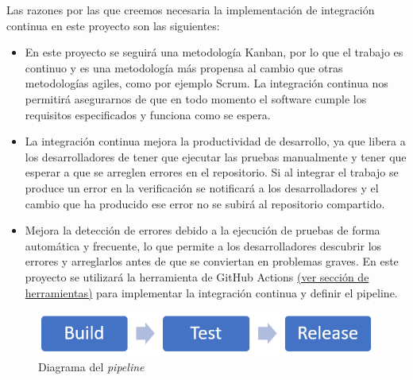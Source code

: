 Las razones por las que creemos necesaria la implementación de integración continua en este proyecto son las siguientes:
\begin{itemize}
    \item En este proyecto se seguirá una metodología Kanban, por lo que el trabajo es continuo y es una metodología más propensa al cambio que otras metodologías agiles, como por ejemplo Scrum. La integración continua nos permitirá asegurarnos de que en todo momento el software cumple los requisitos especificados y funciona como se espera.
    \item La integración continua mejora la productividad de desarrollo, ya que libera a los desarrolladores de tener que ejecutar las pruebas manualmente y tener que esperar a que se arreglen errores en el repositorio. Si al integrar el trabajo se produce un error en la verificación se notificará a los desarrolladores y el cambio que ha producido ese error no se subirá al repositorio compartido.
    \item Mejora la detección de errores debido a la ejecución de pruebas de forma automática y frecuente, lo que permite a los desarrolladores descubrir los errores y arreglarlos antes de que se conviertan en problemas graves.
    En este proyecto se utilizará la herramienta de GitHub Actions \underline{(ver sección de herramientas)} para implementar la integración continua y definir el pipeline.
\end{itemize}
\begin{figure}[h!]
    \centering
    \includegraphics[scale=0.7]{../Imagenes/DiagramaPipeline.png}
    \caption{Diagrama del \textit{pipeline}}
    \label{d1_pipeline}
\end{figure}